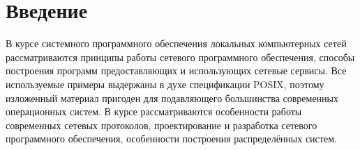 \chapter*{Введение}
В курсе системного программного обеспечения локальных компьютерных сетей рассматриваются принципы работы сетевого программного обеспечения,  способы построения программ предоставляющих и использующих сетевые сервисы.
Все используемые примеры выдержаны в духе спецификации POSIX,  поэтому изложенный материал пригоден для подавляющего большинства современных операционных систем.
В курсе рассматриваются особенности работы современных сетевых протоколов,  проектирование и разработка сетевого программного обеспечения,  особенности построения распределённых систем.

